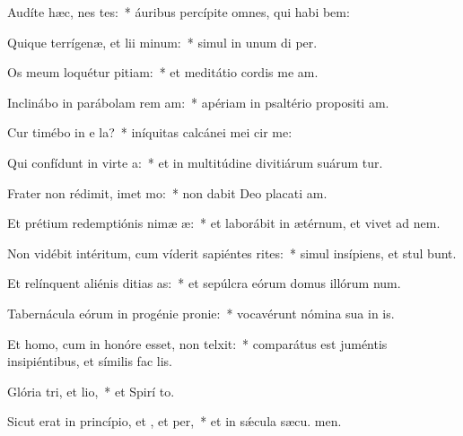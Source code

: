 \item Audíte hæc, nes tes:~* áuribus percípite omnes, qui habi bem:
\item Quique terrígenæ, et lii minum:~* simul in unum di  per.
\item Os meum loquétur pitiam:~* et meditátio cordis me am.
\item Inclinábo in parábolam rem am:~* apériam in psaltério propositi am.
\item Cur timébo in e la?~* iníquitas calcánei mei cir me:
\item Qui confídunt in virte a:~* et in multitúdine divitiárum suárum tur.
\item Frater non rédimit, imet mo:~* non dabit Deo placati am.
\item Et prétium redemptiónis nimæ æ:~* et laborábit in ætérnum, et vivet ad  nem.
\item Non vidébit intéritum, cum víderit sapiéntes rites:~* simul insípiens, et stul bunt.
\item Et relínquent aliénis ditias as:~* et sepúlcra eórum domus illórum  num.
\item Tabernácula eórum in progénie  pronie:~* vocavérunt nómina sua in  is.
\item Et homo, cum in honóre esset, non telxit:~* comparátus est juméntis insipiéntibus, et símilis fac  lis.
\item Glória tri, et lio,~* et Spirí to.
\item Sicut erat in princípio, et , et per,~* et in sǽcula sæcu. men.

